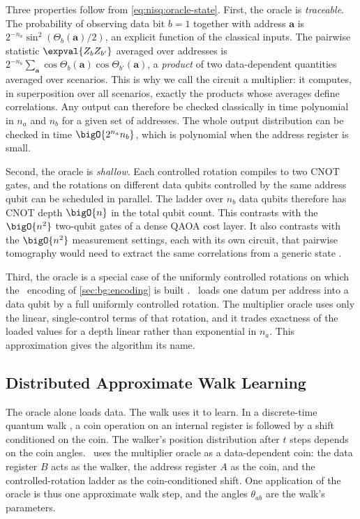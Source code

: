Three properties follow from \cref{eq:nisq:oracle-state}. First, the oracle is \emph{traceable}. The probability of observing data bit $b=1$ together with address $\bm{a}$ is $2^{-n_{a}}\sin^{2}(\Theta_{b}(\bm{a})/2)$, an explicit function of the classical inputs. The pairwise statistic $\expval{Z_{b}Z_{b'}}$ averaged over addresses is $2^{-n_{a}}\sum_{\bm{a}}\cos\Theta_{b}(\bm{a})\cos\Theta_{b'}(\bm{a})$, a \emph{product} of two data-dependent quantities averaged over scenarios. This is why we call the circuit a multiplier: it computes, in superposition over all scenarios, exactly the products whose averages define correlations. Any output can therefore be checked classically in time polynomial in $n_{a}$ and $n_{b}$ for a given set of addresses. The whole output distribution can be checked in time $\bigO{2^{n_{a}}n_{b}}$, which is polynomial when the address register is small.

Second, the oracle is \emph{shallow}. Each controlled rotation compiles to two CNOT gates, and the rotations on different data qubits controlled by the same address qubit can be scheduled in parallel. The ladder over $n_{b}$ data qubits therefore has CNOT depth $\bigO{n}$ in the total qubit count. This contrasts with the $\bigO{n^{2}}$ two-qubit gates of a dense QAOA cost layer. It also contrasts with the $\bigO{n^{2}}$ measurement settings, each with its own circuit, that pairwise tomography would need to extract the same correlations from a generic state \cite{huang2020shadows}.

Third, the oracle is a special case of the uniformly controlled rotations \cite{mottonen2004ucr} on which the \qcrank\ encoding of \cref{sec:bg:encoding} is built \cite{balewski2024qcrank}. \qcrank\ loads one datum per address into a data qubit by a full uniformly controlled rotation. The multiplier oracle uses only the linear, single-control terms of that rotation, and it trades exactness of the loaded values for a depth linear rather than exponential in $n_{a}$. This approximation gives the algorithm its name.

\subsection{Distributed Approximate Walk Learning}\label{sec:nisq:walk}

The oracle alone loads data. The walk uses it to learn. In a discrete-time quantum walk \cite{childs2009quantumwalk}, a coin operation on an internal register is followed by a shift conditioned on the coin. The walker's position distribution after $t$ steps depends on the coin angles. \qawa\ uses the multiplier oracle as a data-dependent coin: the data register $B$ acts as the walker, the address register $A$ as the coin, and the controlled-rotation ladder as the coin-conditioned shift. One application of the oracle is thus one approximate walk step, and the angles $\theta_{ab}$ are the walk's parameters.

